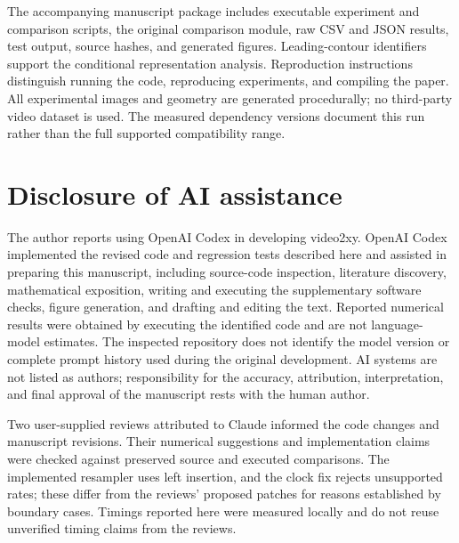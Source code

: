 \documentclass[11pt,a4paper]{article}
\begin{document}
The accompanying manuscript package includes executable experiment and comparison scripts, the original comparison module, raw CSV and JSON results, test output, source hashes, and generated figures. Leading-contour identifiers support the conditional representation analysis. Reproduction instructions distinguish running the code, reproducing experiments, and compiling the paper. All experimental images and geometry are generated procedurally; no third-party video dataset is used. The measured dependency versions document this run rather than the full supported compatibility range.

\section*{Disclosure of AI assistance}
The author reports using OpenAI Codex in developing video2xy. OpenAI Codex implemented the revised code and regression tests described here and assisted in preparing this manuscript, including source-code inspection, literature discovery, mathematical exposition, writing and executing the supplementary software checks, figure generation, and drafting and editing the text. Reported numerical results were obtained by executing the identified code and are not language-model estimates. The inspected repository does not identify the model version or complete prompt history used during the original development. AI systems are not listed as authors; responsibility for the accuracy, attribution, interpretation, and final approval of the manuscript rests with the human author.

Two user-supplied reviews attributed to Claude informed the code changes and manuscript revisions. Their numerical suggestions and implementation claims were checked against preserved source and executed comparisons. The implemented resampler uses left insertion, and the clock fix rejects unsupported rates; these differ from the reviews' proposed patches for reasons established by boundary cases. Timings reported here were measured locally and do not reuse unverified timing claims from the reviews.

\begingroup
\small\raggedright


\endgroup
\end{document}

